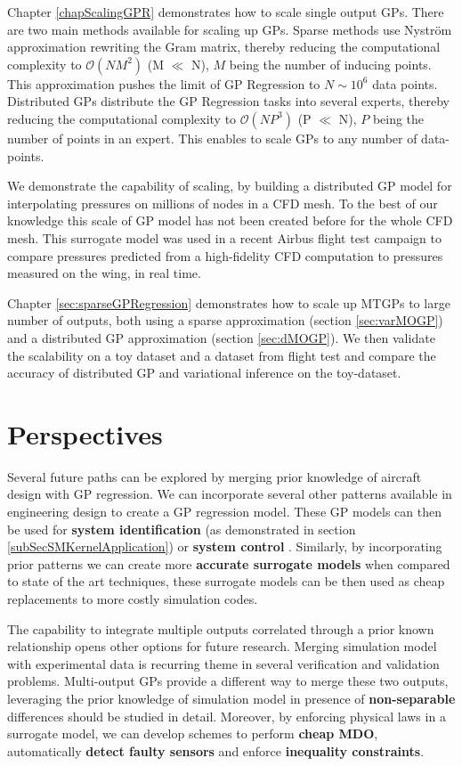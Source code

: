 Chapter \ref{chapScalingGPR} demonstrates how to scale single output GPs. There are two main methods available for scaling up GPs. Sparse methods use Nystr\"{o}m approximation rewriting the Gram matrix, thereby reducing the computational complexity to $\mathcal{O}(NM^{2})$ (M $\ll$ N), $M$ being the number of inducing points. This approximation pushes the limit of GP Regression to $N \sim 10^6$ data points. Distributed GPs distribute the GP Regression tasks into several experts, thereby reducing the computational complexity to $\mathcal{O}(NP^{3})$ (P $\ll$ N), $P$ being the number of points in an expert. This enables to scale GPs to any number of data-points. 

We demonstrate the capability of scaling, by building a distributed GP model for interpolating pressures on millions of nodes in a CFD mesh. To the best of our knowledge this scale of GP model has not been created before for the whole CFD mesh. This surrogate model was used in a recent Airbus flight test campaign to compare pressures predicted from a high-fidelity CFD computation to pressures measured on the wing, in real time.

Chapter \ref{sec:sparseGPRegression} demonstrates how to scale up MTGPs to large number of outputs, both using a sparse approximation (section \ref{sec:varMOGP}) and a distributed GP approximation (section \ref{sec:dMOGP}). We then validate the scalability on a toy dataset and a dataset from flight test and compare the accuracy of distributed GP and variational inference on the toy-dataset. 


\section{Perspectives}
Several future paths can be explored by merging prior knowledge of aircraft design with GP regression. We can incorporate several other patterns available in engineering design to create a GP regression model. These GP models can then be used for \textbf{system identification} (as demonstrated in section \ref{subSecSMKernelApplication}) or \textbf{system control} \cite{kocijan2016modelling, frigola2014variational, deisenroth2011pilco}. Similarly, by incorporating prior patterns we can create more \textbf{accurate surrogate models} when compared to state of the art techniques, these surrogate models can be then used as cheap replacements to more costly simulation codes. 

The capability to integrate multiple outputs correlated through a prior known relationship opens other options for future research. Merging simulation model with experimental data is recurring theme in several verification and validation problems. Multi-output GPs provide a different way to merge these two outputs, leveraging the prior knowledge of simulation model in presence of \textbf{non-separable} differences should be studied in detail. Moreover, by enforcing physical laws in a surrogate model, we can develop schemes to perform \textbf{cheap MDO}, automatically \textbf{detect faulty sensors} and enforce \textbf{inequality constraints}. 

